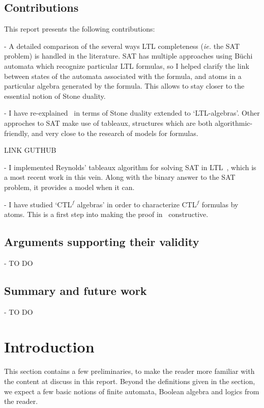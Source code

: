 \documentclass[11pt]{article}
\newcommand{\CTLf}{{CTL$^f$ }}
\begin{document}
\subsection*{Contributions}
This report presents the following contributions:

- A detailed comparison of the several ways LTL completeness
(\emph{ie.} the SAT problem) is handled
in the literature. SAT has 
multiple approaches using Büchi automata which recognize particular
LTL formulas, so I helped clarify the link between states
of the automata associated with the formula,
and atoms in a particular algebra generated by the formula.
This allows to stay closer to the essential notion of Stone duality.

- I have re-explained~\cite{GhivG17}
in terms of Stone duality extended to `LTL-algebras'. Other approches 
to SAT make use of tableaux, structures which are both algorithmic-friendly,
and very close to the research of models for formulas. 

LINK GUTHUB

- I implemented Reynolds' tableaux
algorithm for solving SAT in LTL~\cite{ReyLTL}, which is a most recent work in this vein.
Along with the binary answer to the SAT problem, it provides a model when
it can.

- I have studied `{\CTLf}algebras' in order to characterize
{\CTLf}formulas by atoms. This is a first step into making the proof in~\cite{GhivG16} constructive.



\subsection*{Arguments supporting their validity}
- TO DO



\subsection*{Summary and future work}
- TO DO
\newpage  

\section{Introduction}
This section contains a few preliminaries, to make the reader more familiar with the
content at discuss in this report. Beyond the definitions given in the section, we expect
a few basic notions of finite automata, Boolean algebra and  logics from the reader.
\end{document}

